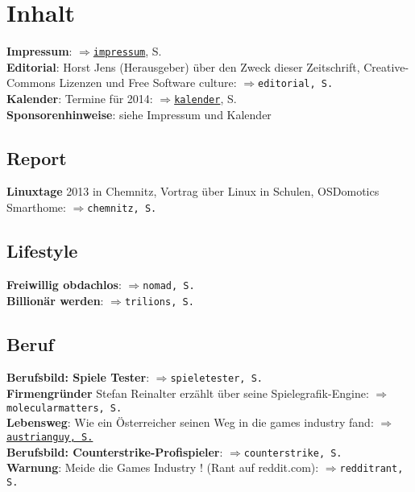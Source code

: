 \section*{Inhalt} 
\label{inhalt}

\textbf{Impressum}: $\Rightarrow$\hyperlink{impressum}{\texttt{impressum}}, S. \pageref{impressum}\\
\textbf{Editorial}: Horst Jens (Herausgeber) über den Zweck dieser Zeitschrift, Creative-Commons Lizenzen und Free Software culture: $\Rightarrow$\texttt{editorial, S. \pageref{editorial}}\\ 
\textbf{Kalender}: Termine für 2014: \hyperlink{kalender}{$\Rightarrow$\texttt{kalender}}, S. \pageref{kalender}\\
\textbf{Sponsorenhinweise}: siehe Impressum und Kalender \\

\subsection*{Report}

\textbf{Linuxtage} 2013 in Chemnitz, Vortrag über Linux in Schulen, OSDomotics Smarthome: $\Rightarrow$\texttt{chemnitz, S. \pageref{chemnitz}}\\

\subsection*{Lifestyle}

\textbf{Freiwillig obdachlos}: $\Rightarrow$\texttt{nomad, S. \pageref{nomad}}\\
\textbf{Billionär werden}: $\Rightarrow$\texttt{trilions, S. \pageref{trillions}}\\

\subsection*{Beruf}

\textbf{Berufsbild: Spiele Tester}: $\Rightarrow$\texttt{spieletester, S. \pageref{spieletester}}\\
\textbf{Firmengründer} Stefan Reinalter erzählt über seine Spielegrafik-Engine: $\Rightarrow$\texttt{molecularmatters, S. \pageref{molecularmatters}}\\
\textbf{Lebensweg}: Wie ein Österreicher seinen Weg in die games industry fand: \hyperlink{austrianguy}{$\Rightarrow$\texttt{austrianguy, S.} \pageref{austrianguy}}\\
\textbf{Berufsbild: Counterstrike-Profispieler}: $\Rightarrow$\texttt{counterstrike, S. \pageref{counterstrike}}\\
\textbf{Warnung}: Meide die Games Industry ! (Rant auf reddit.com): $\Rightarrow$\texttt{redditrant, S. \pageref{redditrant}}\\

